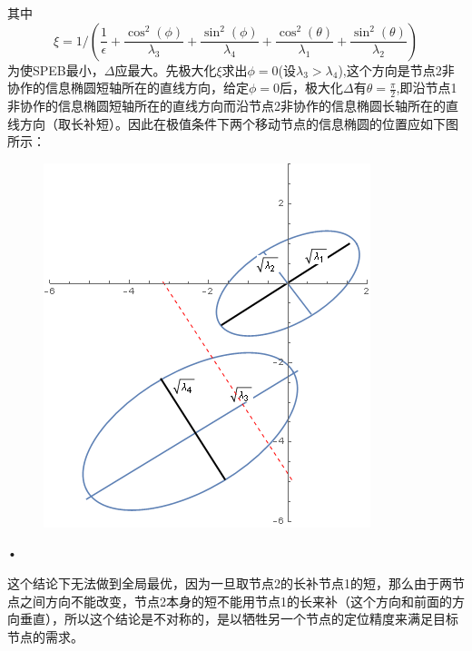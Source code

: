 \documentclass[12pt]{article}
\theoremstyle{remark}
\begin{document}
其中
\begin{equation}
\xi=1/(\frac{1}{\epsilon}+\frac{\cos^2(\phi)}{\lambda_3}+\frac{\sin^2(\phi)}{\lambda_4}+\frac{\cos^2(\theta)}{\lambda_1}+\frac{\sin^2(\theta)}{\lambda_2})
\end{equation}
为使SPEB最小，$\Delta$应最大。先极大化$\xi$求出$\phi=0$(设$\lambda_3>\lambda_4$),这个方向是节点2非协作的信息椭圆短轴所在的直线方向，给定$\phi=0$后，极大化$\Delta$有$\theta=\frac{\pi}{2}$,即沿节点1非协作的信息椭圆短轴所在的直线方向而沿节点2非协作的信息椭圆长轴所在的直线方向（取长补短）。因此在极值条件下两个移动节点的信息椭圆的位置应如下图所示：
\begin{figure}[!ht]
\includegraphics[width=\textwidth]{InfoEllipse.png}
\end{figure}•

这个结论下无法做到全局最优，因为一旦取节点2的长补节点1的短，那么由于两节点之间方向不能改变，节点2本身的短不能用节点1的长来补（这个方向和前面的方向垂直），所以这个结论是不对称的，是以牺牲另一个节点的定位精度来满足目标节点的需求。
\end{document}
